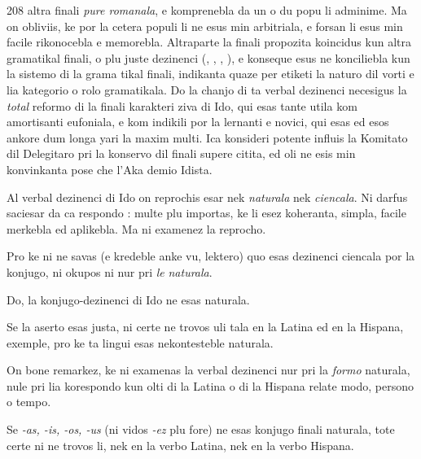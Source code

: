 \begin{VUpage}[212]{208}
\VUcontinue
altra finali \textit{pure romanala}, e komprenebla da un o du popu\cc
li adminime. Ma on obliviis, ke por la cetera populi li ne\nl
esus min arbitriala, e forsan li esus min facile rikonocebla\nl
e memorebla. Altraparte la finali propozita koincidus kun\nl
altra gramatikal finali, o plu juste dezinenci (, , , ),\nl
e konseque esus ne konciliebla kun la sistemo di la grama\cc
tikal finali, indikanta quaze per etiketi la naturo dil vorti\nl
e lia kategorio o rolo gramatikala. Do la chanjo di ta verbal\nl
dezinenci necesigus la \textit{total} reformo di la finali karakteri\cc
ziva di Ido, qui esas tante utila kom amortisanti eufoniala,\nl
e kom indikili por la lernanti e novici, qui esas ed esos\nl
ankore dum longa yari la maxim multi. Ica konsideri potente\nl
influis la Komitato dil Delegitaro pri la konservo dil finali\nl
supere citita, ed oli ne esis min konvinkanta pose che l'Aka\cc
demio Idista.

Al verbal dezinenci di Ido on reprochis esar nek \textit{naturala}\nl
nek \textit{ciencala}. Ni darfus saciesar da ca respondo : multe plu\nl
importas, ke li esez koheranta, simpla, facile merkebla ed\nl
aplikebla. Ma ni examenez la reprocho.

Pro ke ni ne savas (e kredeble anke vu, lektero) quo esas\nl
dezinenci ciencala por la konjugo, ni okupos ni nur pri \textit{le}\nl
\textit{naturala}.

Do, la konjugo-dezinenci di Ido ne esas naturala.

Se la aserto esas justa, ni certe ne trovos uli tala en la\nl
Latina ed en la Hispana, exemple, pro ke ta lingui esas\nl
nekontesteble naturala.

On bone remarkez, ke ni examenas la verbal dezinenci\nl
nur pri la \textit{formo} naturala, nule pri lia korespondo kun olti\nl
di la Latina o di la Hispana relate modo, persono o tempo.

\VUblanc{1.27mm}
Se \textit{-as, -is, -os, -us} (ni vidos \textit{-ez} plu fore) ne esas konjugo\cc
finali naturala, tote certe ni ne trovos li, nek en la verbo\nl
Latina, nek en la verbo Hispana.


\end{VUpage}
